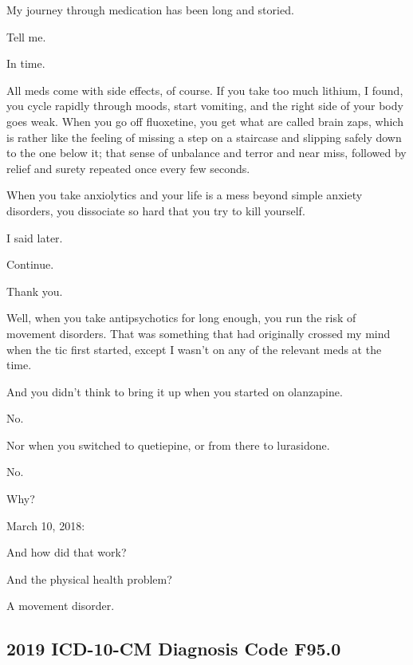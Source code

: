 \noindent My journey through medication has been long and storied.

\begin{ally}
Tell me.
\end{ally}
In time.

All meds come with side effects, of course. If you take too much lithium, I found, you cycle rapidly through moods, start vomiting, and the right side of your body goes weak. When you go off fluoxetine, you get what are called brain zaps, which is rather like the feeling of missing a step on a staircase and slipping safely down to the one below it; that sense of unbalance and terror and near miss, followed by relief and surety repeated once every few seconds.

\begin{ally}
When you take anxiolytics and your life is a mess beyond simple anxiety disorders, you dissociate so hard that you try to kill yourself.
\end{ally}
I said later.

\begin{ally}
Continue.
\end{ally}
Thank you.

Well, when you take antipsychotics for long enough, you run the risk of movement disorders. That was something that had originally crossed my mind when the tic first started, except I wasn't on any of the relevant meds at the time.

\begin{ally}
And you didn't think to bring it up when you started on olanzapine.
\end{ally}
No.

\begin{ally}
Nor when you switched to quetiepine, or from there to lurasidone.
\end{ally}
No.

\begin{ally}
Why?
\end{ally}
March 10, 2018:

\begin{ally}
And how did that work?
\end{ally}
\begin{ally}
And the physical health problem?
\end{ally}
A movement disorder.
\newpage

\hypertarget{icd-10-cm-diagnosis-code-f95.0}{%
\subsection{2019 ICD-10-CM Diagnosis Code F95.0}\label{icd-10-cm-diagnosis-code-f95.0}}


